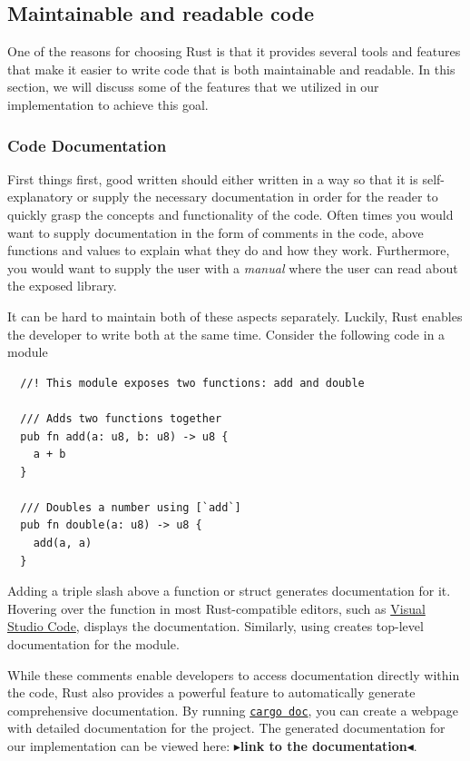 \documentclass[twoside,11pt]{report}
\theoremstyle{definition}
\theoremstyle{plain}
\newcommand{\todo}[1]{{\color[rgb]{.5,0,0}\textbf{$\blacktriangleright$#1$\blacktriangleleft$}}}
\begin{document}
\subsection{Maintainable and readable code}
One of the reasons for choosing Rust is that it provides several tools and features that make it easier to write code that is both maintainable and readable. In this section, we will discuss some of the features that we utilized in our implementation to achieve this goal.

\subsubsection{Code Documentation}\label{sec:code-documentation}
First things first, good written should either written in a way so that it is self-explanatory or supply the necessary documentation in order for the reader to quickly grasp the concepts and functionality of the code. Often times you would want to supply documentation in the form of comments in the code, above functions and values to explain what they do and how they work. Furthermore, you would want to supply the user with a \textit{manual} where the user can read about the exposed library.

It can be hard to maintain both of these aspects separately. Luckily, Rust enables the developer to write both at the same time. Consider the following code in a module

\begin{verbatim}
  //! This module exposes two functions: add and double

  /// Adds two functions together
  pub fn add(a: u8, b: u8) -> u8 { 
    a + b
  }

  /// Doubles a number using [`add`]
  pub fn double(a: u8) -> u8 {
    add(a, a)
  }
\end{verbatim}

Adding a triple slash \rust{///} above a function or struct generates documentation for it. Hovering over the function in most Rust-compatible editors, such as \href{https://code.visualstudio.com/docs/languages/rust}{Visual Studio Code}, displays the documentation. Similarly, using \rust{//!} creates top-level documentation for the module.

While these comments enable developers to access documentation directly within the code, Rust also provides a powerful feature to automatically generate comprehensive documentation. By running \href{https://doc.rust-lang.org/cargo/commands/cargo-doc.html}{\texttt{cargo doc}}, you can create a webpage with detailed documentation for the project. The generated documentation for our implementation can be viewed here: \todo{link to the documentation}.
\end{document}

